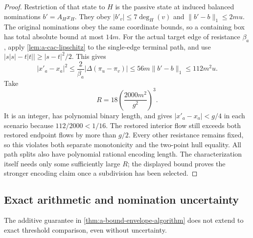 \begin{proof}
Restriction of that state to $H$ is the passive state at induced
balanced nominations $b'=A_Hx_H$. They obey
$|b'_v|\le7\deg_H(v)$ and
$\|b'-b\|_1\le2mu$. The original nominations obey the same coordinate
bounds, so a containing box has total absolute bound at most $14m$.
For the actual target edge of resistance $\beta_a$, apply
\cref{lem:a-cac-lipschitz} to the single-edge terminal path, and use
$\bigl|s|s|-t|t|\bigr|\ge |s-t|^2/2$. This gives
\[
 |x'_a-x_a|^2\le\frac2{\beta_a}|\Delta(\pi_u-\pi_v)|
 \le56m\|b'-b\|_1\le112m^2u.
\]
Take
\[
 R=18\left(\frac{2000m^2}{g^2}\right)^3.
\]
It is an integer, has polynomial binary length, and gives
$|x'_a-x_a|<g/4$ in each scenario because $112/2000<1/16$.
The restored interior flow still exceeds both restored endpoint flows
by more than $g/2$. Every other resistance remains fixed, so this
violates both separate monotonicity and the two-point hull equality.
All path splits also have polynomial rational encoding length. The
characterization itself needs only some sufficiently large $R$; the
displayed bound proves the stronger encoding claim once a subdivision
has been selected.
\end{proof}

\subsection{Exact arithmetic and nomination uncertainty}
\label{subsec:a-bound-unbounded}

The additive guarantee in \cref{thm:a-bound-envelope-algorithm} does
not extend to exact threshold comparison, even without uncertainty.

